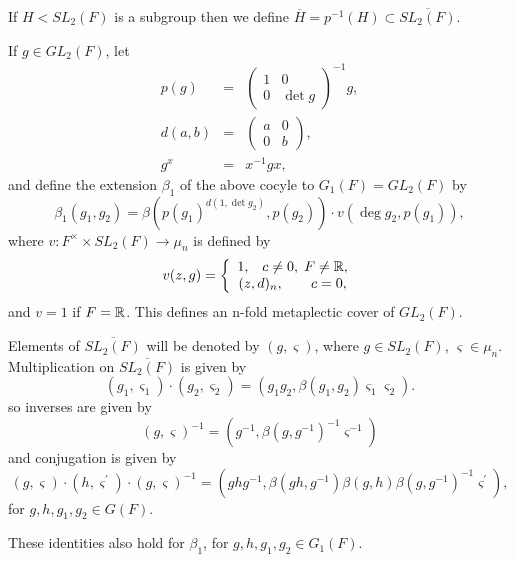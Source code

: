 If $H<SL_2(F)$ is a subgroup then we define $\overline{H}=p^{-1}(H)\subset 
\overline{SL_2(F)}$.

If $g\in GL_2(F)$, let 
\begin{eqnarray*}
p(g) &=&\left( 
\begin{array}{cc}
1 & 0 \\ 
0 & \det g
\end{array}
\right) ^{-1}g, \\
d(a,b) &=&\left( 
\begin{array}{cc}
a & 0 \\ 
0 & b
\end{array}
\right) , \\
g^x &=&x^{-1}gx,
\end{eqnarray*}
and define the extension $\beta _1$ of the above cocyle to
$G_1(F)=GL_2(F)$ by 
\begin{equation}
\beta _1(g_1,g_2)=\beta (p(g_1)^{d(1,\det g_2)},p(g_2))\cdot v(\deg
g_2,p(g_1)),
\end{equation}
where $v:F^{\times }\times SL_2(F)\rightarrow \mu _n$ is defined by 
\[
v(z,g)=\left\{ 
\begin{array}{c}
1,\;\;\;c\neq 0,\;F\neq {\Bbb R}, \\ 
(z,d)_n,\;\;\;\;\;\;\;c=0,
\end{array}
\right. 
\]
and $v=1$ if $F={\Bbb R}$. This defines an n-fold metaplectic cover of $%
GL_2(F)$.

Elements of $\overline{SL_2(F)}$ will be denoted by $(g,\varsigma )$, where $%
g\in SL_2(F)$, $\varsigma \in \mu _n$. Multiplication on $\overline{SL_2(F)}$
is given by 
\begin{equation}
(g_1,\varsigma _1)\cdot (g_2,\varsigma _2)=(g_1g_2,\beta (g_1,g_2)\varsigma
_1\varsigma _2).
\end{equation}
so inverses are given by 
\begin{equation}
(g,\varsigma )^{-1}=(g^{-1},\beta (g,g^{-1})^{-1}\varsigma ^{-1})
\end{equation}
and conjugation is given by 
\begin{equation}
(g,\varsigma )\cdot (h,\varsigma ^{\prime })\cdot (g,\varsigma
)^{-1}=(ghg^{-1},\beta (gh,g^{-1})\beta (g,h)\beta (g,g^{-1})^{-1}\varsigma
^{\prime }),
\end{equation}
for $g,h,g_1,g_2\in G(F)$.

These identities also hold for $\beta _1$,
for $g,h,g_1,g_2\in G_1(F)$.

